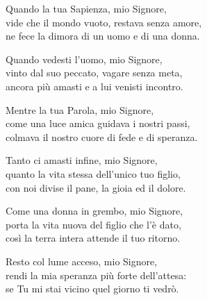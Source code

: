 
\strofa Quando la tua Sapienza, mio Signore,\\
vide che il mondo vuoto, restava senza amore,\\
ne fece la dimora di un uomo e di una donna.

\spazio

\strofa Quando vedesti l'uomo, mio Signore,\\
vinto dal suo peccato, vagare senza meta,\\
ancora più amasti e a lui venisti incontro.

\spazio

\strofa Mentre la tua Parola, mio Signore,\\
come una luce amica guidava i nostri passi,\\
colmava il nostro cuore di fede e di speranza.

\spazio

\strofa Tanto ci amasti infine, mio Signore,\\
quanto la vita stessa dell'unico tuo figlio,\\
con noi divise il pane, la gioia ed il dolore.

\spazio

\strofa Come una donna in grembo, mio Signore,\\
porta la vita nuova del figlio che l'è dato,\\
così la terra intera attende il tuo ritorno.

\spazio

\strofa Resto col lume acceso, mio Signore,\\
rendi la mia speranza più forte dell'attesa:\\
se Tu mi stai vicino quel giorno ti vedrò.